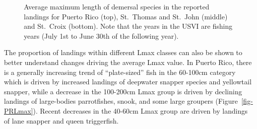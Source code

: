 \documentclass[
  letterpaper,
  oneside,
  open=any]{scrbook}
\begin{document}
\begin{figure}


\caption{\label{fig-avgLmax}Average maximum length of demersal species
in the reported landings for Puerto Rico (top), St.~Thomas and St.~John
(middle) and St.~Croix (bottom). Note that the years in the USVI are
fishing years (July 1st to June 30th of the following year).}

\end{figure}%

The proportion of landings within different Lmax classes can also be
shown to better understand changes driving the average Lmax value. In
Puerto Rico, there is a generally increasing trend of ``plate-sized''
fish in the 60-100cm category which is driven by increased landings of
deepwater snapper species and yellowtail snapper, while a decrease in
the 100-200cm Lmax group is driven by declining landings of large-bodies
parrotfishes, snook, and some large groupers (Figure~\ref{fig-PRLmax}).
Recent decreases in the 40-60cm Lmax group are driven by landings of
lane snapper and queen triggerfish.
\end{document}
